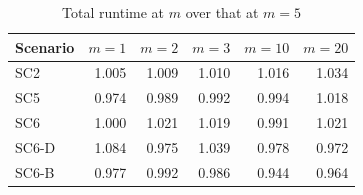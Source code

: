 \begin{table}[!htbp]\centering
\caption{Total runtime at $m$ over that at $m=5$}\label{tab:be_window}
\begin{tabular*}{\textwidth}{@{\extracolsep\fill}lrrrrr}\toprule
Scenario & $m=1$ & $m=2$ & $m=3$ & $m=10$ & $m=20$ \\\midrule
SC2 & 1.005 & 1.009 & 1.010 & 1.016 & 1.034 \\
SC5 & 0.974 & 0.989 & 0.992 & 0.994 & 1.018 \\
SC6 & 1.000 & 1.021 & 1.019 & 0.991 & 1.021 \\
SC6-D & 1.084 & 0.975 & 1.039 & 0.978 & 0.972 \\
SC6-B & 0.977 & 0.992 & 0.986 & 0.944 & 0.964 \\
\bottomrule\end{tabular*}
\end{table}
